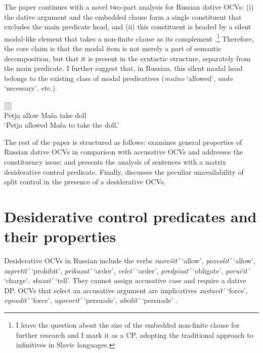 \documentclass[output=paper,
colorlinks,
citecolor=brown,
newtxmath
]{langscibook}
\begin{document}
\noindent The paper continues with a novel two-part analysis for Russian dative OCVs: (i) the dative argument and the embedded clause form a single constituent that excludes the main predicate head, and (ii) this constituent is headed by a silent modal-like element that takes a non-finite clause as its complement .\footnote{I leave the question about the size of the embedded non-finite clause for further research and I mark it as a CP, adopting the traditional \cite{Lasnik1998} approach to infinitives in Slavic languages.} Therefore, the core claim is that the modal item is not merely a part of semantic decomposition, but that it is present in the syntactic structure, separately from the main predicate. I further suggest that, in Russian, this silent modal head belongs to the existing class of modal predicatives (\textit{možno} `allowed’, \textit{nado} `necessary’, etc.). 

\begin{exe}
\ex\label{ex2}
\gll [\textsubscript{\textit{v}P} Petja [\textsubscript{VP} [\textsubscript{V} razrešil][\textsubscript{ModP} [\hspace{-2pt} Maše$_i$] [\textsubscript{Mod$'$} \textit{modal} [\textsubscript{CP} PRO$_i$ vzjat’ kuklu]]]]]\\ 
{} Petja {} {} allow {} Maša {} {} {} {} take doll\\
\glt `Petja allowed Maša to take the doll.'
\end{exe}

\noindent The rest of the paper is structured as follows:  examines general properties of Russian dative OCVs in comparison with accusative OCVs and addresses the constituency issue; and  presents the analysis of sentences with a matrix desiderative control predicate. Finally,  discusses the peculiar unavailability of split control in the presence of a desiderative OCVs. 

\section{Desiderative control predicates and their properties}\label{s2}

Desiderative OCVs in Russian include the verbs \textit{razrešit’} `allow', \textit{pozvolit’} `allow', \textit{zapretit’} `prohibit', \textit{prikazat’} `order', \textit{velet’} `order', \textit{predpisat’} `obligate', \textit{poručit’} `charge', \textit{skazat’} `tell'. They cannot assign accusative case and require a dative DP. OCVs that select an accusative argument are implicatives \textit{zastavit’} `force', \textit{vynudit’} `force', \textit{ugovorit’} `persuade', \textit{ubedit’} `persuade’ .
\end{document}
